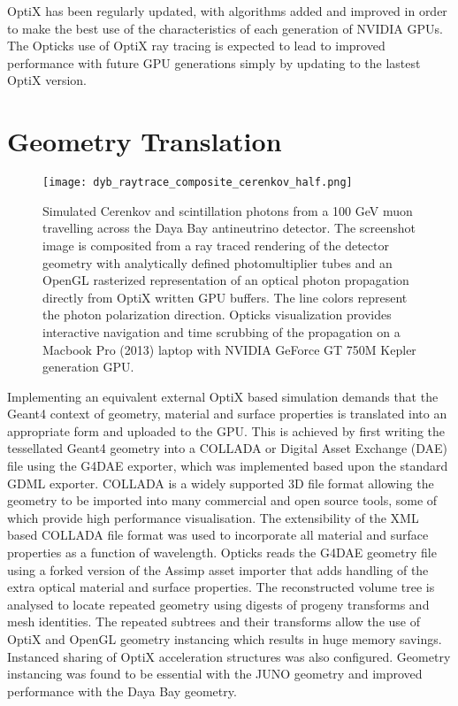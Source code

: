 \documentclass[a4paper]{jpconf}
\begin{document}
OptiX has been regularly updated, with algorithms added and improved in order 
to make the best use of the characteristics of each generation of NVIDIA GPUs. 
The Opticks use of OptiX ray tracing is expected to lead to improved performance
with future GPU generations simply by updating to the lastest OptiX version. 


\section{Geometry Translation}

\begin{figure}[htbp]
\centering
\texttt{[image: dyb\_raytrace\_composite\_cerenkov\_half.png]}
\caption{
Simulated Cerenkov and scintillation photons from a 100 GeV muon travelling
across the Daya Bay antineutrino detector. The screenshot image is composited from 
a ray traced rendering of the detector geometry with analytically defined photomultiplier tubes 
and an OpenGL rasterized representation of an optical photon propagation directly from OptiX written GPU buffers. 
The line colors represent the photon polarization direction. Opticks visualization
provides interactive navigation and time scrubbing of the propagation on a 
Macbook Pro (2013) laptop with NVIDIA GeForce GT 750M Kepler generation GPU.
}
\end{figure}

Implementing an equivalent external OptiX based simulation demands that the Geant4 
context of geometry, material and surface properties is translated into 
an appropriate form and uploaded to the GPU.
This is achieved by first writing the tessellated Geant4 geometry into a 
COLLADA or Digital Asset Exchange (DAE) file using the G4DAE\cite{g4daeURL} exporter, 
which was implemented based upon the standard GDML exporter. 
COLLADA is a widely supported 3D file format allowing the geometry 
to be imported into many commercial and open source tools, some 
of which provide high performance visualisation.
The extensibility of the XML based COLLADA file format was used to 
incorporate all material and surface properties as a function of wavelength.
Opticks reads the G4DAE geometry file using a forked version\cite{AssimpFork} of the
Assimp\cite{Assimp} asset importer that adds handling of the extra optical material and surface
properties. 
The reconstructed volume tree is analysed to locate repeated geometry using digests 
of progeny transforms and mesh identities. The repeated subtrees and their transforms  
allow the use of OptiX and OpenGL geometry instancing which results in huge memory 
savings. Instanced sharing of OptiX acceleration structures was also configured. 
Geometry instancing was found to be essential with the JUNO geometry and improved performance
with the Daya Bay geometry.
\end{document}
